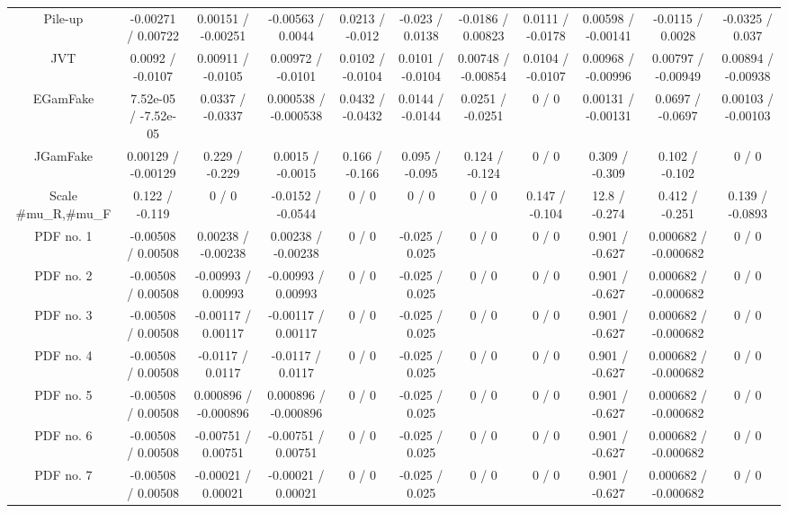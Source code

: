 \begin{table}[htbp]
\begin{center}
\begin{tabular}{|c|c|c|c|c|c|c|c|c|c|c|}
  Pile-up & -0.00271 / 0.00722 & 0.00151 / -0.00251 & -0.00563 / 0.0044 & 0.0213 / -0.012 & -0.023 / 0.0138 & -0.0186 / 0.00823 & 0.0111 / -0.0178 & 0.00598 / -0.00141 & -0.0115 / 0.0028 & -0.0325 / 0.037 \\ 
  JVT & 0.0092 / -0.0107 & 0.00911 / -0.0105 & 0.00972 / -0.0101 & 0.0102 / -0.0104 & 0.0101 / -0.0104 & 0.00748 / -0.00854 & 0.0104 / -0.0107 & 0.00968 / -0.00996 & 0.00797 / -0.00949 & 0.00894 / -0.00938 \\ 
  EGamFake & 7.52e-05 / -7.52e-05 & 0.0337 / -0.0337 & 0.000538 / -0.000538 & 0.0432 / -0.0432 & 0.0144 / -0.0144 & 0.0251 / -0.0251 & 0 / 0 & 0.00131 / -0.00131 & 0.0697 / -0.0697 & 0.00103 / -0.00103 \\ 
  JGamFake & 0.00129 / -0.00129 & 0.229 / -0.229 & 0.0015 / -0.0015 & 0.166 / -0.166 & 0.095 / -0.095 & 0.124 / -0.124 & 0 / 0 & 0.309 / -0.309 & 0.102 / -0.102 & 0 / 0 \\ 
  Scale #mu_{R},#mu_{F} & 0.122 / -0.119 & 0 / 0 & -0.0152 / -0.0544 & 0 / 0 & 0 / 0 & 0 / 0 & 0.147 / -0.104 & 12.8 / -0.274 & 0.412 / -0.251 & 0.139 / -0.0893 \\ 
  PDF no. 1 & -0.00508 / 0.00508 & 0.00238 / -0.00238 & 0.00238 / -0.00238 & 0 / 0 & -0.025 / 0.025 & 0 / 0 & 0 / 0 & 0.901 / -0.627 & 0.000682 / -0.000682 & 0 / 0 \\ 
  PDF no. 2 & -0.00508 / 0.00508 & -0.00993 / 0.00993 & -0.00993 / 0.00993 & 0 / 0 & -0.025 / 0.025 & 0 / 0 & 0 / 0 & 0.901 / -0.627 & 0.000682 / -0.000682 & 0 / 0 \\ 
  PDF no. 3 & -0.00508 / 0.00508 & -0.00117 / 0.00117 & -0.00117 / 0.00117 & 0 / 0 & -0.025 / 0.025 & 0 / 0 & 0 / 0 & 0.901 / -0.627 & 0.000682 / -0.000682 & 0 / 0 \\ 
  PDF no. 4 & -0.00508 / 0.00508 & -0.0117 / 0.0117 & -0.0117 / 0.0117 & 0 / 0 & -0.025 / 0.025 & 0 / 0 & 0 / 0 & 0.901 / -0.627 & 0.000682 / -0.000682 & 0 / 0 \\ 
  PDF no. 5 & -0.00508 / 0.00508 & 0.000896 / -0.000896 & 0.000896 / -0.000896 & 0 / 0 & -0.025 / 0.025 & 0 / 0 & 0 / 0 & 0.901 / -0.627 & 0.000682 / -0.000682 & 0 / 0 \\ 
  PDF no. 6 & -0.00508 / 0.00508 & -0.00751 / 0.00751 & -0.00751 / 0.00751 & 0 / 0 & -0.025 / 0.025 & 0 / 0 & 0 / 0 & 0.901 / -0.627 & 0.000682 / -0.000682 & 0 / 0 \\ 
  PDF no. 7 & -0.00508 / 0.00508 & -0.00021 / 0.00021 & -0.00021 / 0.00021 & 0 / 0 & -0.025 / 0.025 & 0 / 0 & 0 / 0 & 0.901 / -0.627 & 0.000682 / -0.000682 & 0 / 0 \\ 

\end{tabular}
\end{center}
\end{table}
